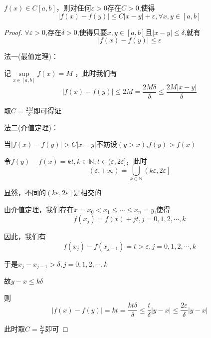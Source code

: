 \documentclass[lang=cn,10pt]{elegantbook}
\begin{document}
	\begin{example}
		$f(x)\in C[a,b]$，则对任何$\varepsilon >0$存在$C>0$,使得
		\begin{equation*}
			|f(x)-f(y)|\le C|x-y|+\varepsilon ,\forall x,y\in[a,b]
		\end{equation*}
	\end{example}
	\begin{proof}
		
		$\forall\varepsilon >0$,存在$\delta>0$,使得只要$x,y\in [a,b]$且$|x-y|\le \delta$,就有
		\begin{equation*}
			|f(x)-f(y)|\le\varepsilon
		\end{equation*}
		
		法一(最值定理)：
		
		记$\mathop {\mathrm{sup}} \limits_{x\in \left[ a,b \right]}f\left( x \right) =M$
		，此时我们有
		\begin{equation*}
			|f\left( x \right) -f\left( y \right) |\le 2M=\frac{2M\delta}{\delta}\le \frac{2M|x-y|}{\delta}
		\end{equation*}
		
		取$C=\frac{2M}{\delta}$即可得证
		
		法二(介值定理)：
		
		当$|f(x)-f(y)|> C|x-y|$不妨设$(y>x)$,$f(y)>f(x)$
		
		令$f(y)-f(x)=kt,k\in\mathbb{N},t\in(\varepsilon,2\varepsilon]$，此时
		\begin{equation*}
			\left( \varepsilon ,+\infty \right) =\bigcup_{k\in \mathbb{N}}{\left( k\varepsilon ,2\varepsilon \right]}
		\end{equation*}
		
		显然，不同的$\left( k\varepsilon ,2\varepsilon \right]$是相交的
		
		由介值定理，我们存在$x=x_{0}<x_{1}\le\cdots\le x_{n}=y$,使得
		\begin{equation*}
			f\left( x_j \right) =f\left( x \right) +jt,j=0,1,2,\cdots ,k
		\end{equation*}
		
		因此，我们有
		\begin{equation*}
			f(x_{j})-f(x_{j-1})=t>\varepsilon,j=0,1,2,\cdots ,k
		\end{equation*}
		
		于是$x_{j}-x_{j-1}>\delta,j=0,1,2,\cdots ,k$
		
		故$y-x\le k\delta$
		
		则
		\begin{equation*}
			|f\left( x \right) -f\left( y \right) |=kt=\frac{kt\delta}{\delta}\le \frac{t}{\delta}|y-x|\le \frac{2\varepsilon}{\delta}|y-x|
		\end{equation*}
		
		此时取$C=\frac{2\varepsilon}{\delta}$即可
	\end{proof}
\end{document}

